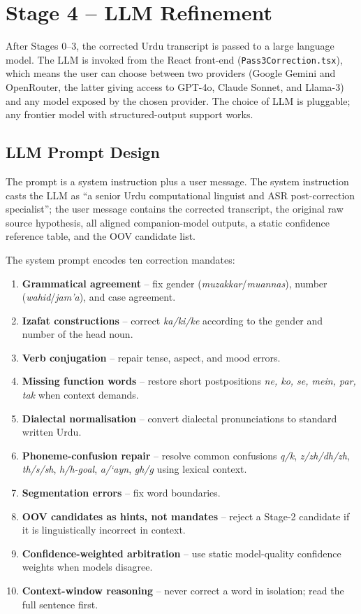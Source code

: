 \section{Stage 4 -- LLM Refinement}
\label{sec:stage4}

After Stages 0--3, the corrected Urdu transcript is passed to a large language model. The LLM is invoked from the React front-end (\texttt{Pass3Correction.tsx}), which means the user can choose between two providers (Google Gemini and OpenRouter, the latter giving access to GPT-4o, Claude Sonnet, and Llama-3) and any model exposed by the chosen provider. The choice of LLM is pluggable; any frontier model with structured-output support works.

\subsection{LLM Prompt Design}
\label{ssec:llm-prompt}

The prompt is a system instruction plus a user message. The system instruction casts the LLM as ``a senior Urdu computational linguist and ASR post-correction specialist''; the user message contains the corrected transcript, the original raw source hypothesis, all aligned companion-model outputs, a static confidence reference table, and the OOV candidate list.

The system prompt encodes ten correction mandates:

\begin{enumerate}[leftmargin=2.2em]
 \item \textbf{Grammatical agreement} -- fix gender (\textit{muzakkar}/\textit{muannas}), number (\textit{wahid}/\textit{jam'a}), and case agreement.
 \item \textbf{Izafat constructions} -- correct \textit{ka/ki/ke} according to the gender and number of the head noun.
 \item \textbf{Verb conjugation} -- repair tense, aspect, and mood errors.
 \item \textbf{Missing function words} -- restore short postpositions \textit{ne, ko, se, mein, par, tak} when context demands.
 \item \textbf{Dialectal normalisation} -- convert dialectal pronunciations to standard written Urdu.
 \item \textbf{Phoneme-confusion repair} -- resolve common confusions \textit{q/k}, \textit{z/zh/dh/zh}, \textit{th/s/sh}, \textit{h/h-goal}, \textit{a/`ayn}, \textit{gh/g} using lexical context.
 \item \textbf{Segmentation errors} -- fix word boundaries.
 \item \textbf{OOV candidates as hints, not mandates} -- reject a Stage-2 candidate if it is linguistically incorrect in context.
 \item \textbf{Confidence-weighted arbitration} -- use static model-quality confidence weights when models disagree.
 \item \textbf{Context-window reasoning} -- never correct a word in isolation; read the full sentence first.
\end{enumerate}

